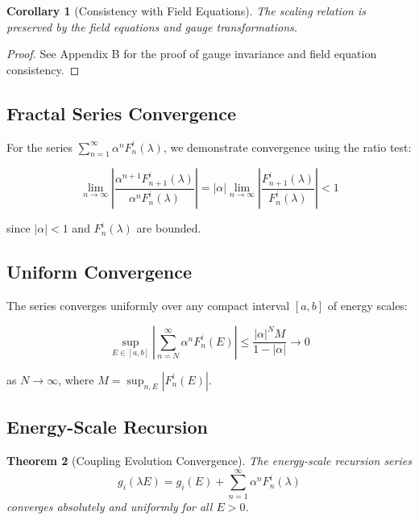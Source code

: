 \documentclass[12pt]{article}
\newtheorem{theorem}{Theorem}[section]
\newtheorem{corollary}[theorem]{Corollary}
\begin{document}
\begin{corollary}[Consistency with Field Equations]
The scaling relation is preserved by the field equations and gauge transformations.
\end{corollary}

\begin{proof}
See Appendix B for the proof of gauge invariance and field equation consistency.
\end{proof}

\subsection{Fractal Series Convergence}

For the series $\sum_{n=1}^{\infty} \alpha^n F_n^i(\lambda)$, we demonstrate convergence using the ratio test:

\begin{equation}
\lim_{n \to \infty} \left|\frac{\alpha^{n+1} F_{n+1}^i(\lambda)}{\alpha^n F_n^i(\lambda)}\right| = |\alpha| \lim_{n \to \infty} \left|\frac{F_{n+1}^i(\lambda)}{F_n^i(\lambda)}\right| < 1
\end{equation}

since $|\alpha| < 1$ and $F_n^i(\lambda)$ are bounded.

\subsection{Uniform Convergence}

The series converges uniformly over any compact interval $[a,b]$ of energy scales:

\begin{equation}
\sup_{E \in [a,b]} \left|\sum_{n=N}^{\infty} \alpha^n F_n^i(E)\right| \leq \frac{|\alpha|^N M}{1-|\alpha|} \to 0
\end{equation}

as $N \to \infty$, where $M = \sup_{n,E} |F_n^i(E)|$.

\subsection{Energy-Scale Recursion}

\begin{theorem}[Coupling Evolution Convergence]
The energy-scale recursion series
\[
g_i(\lambda E) = g_i(E) + \sum_{n=1}^{\infty} \alpha^n F_n^i(\lambda)
\]
converges absolutely and uniformly for all $E > 0$.
\end{theorem}
\end{document}
